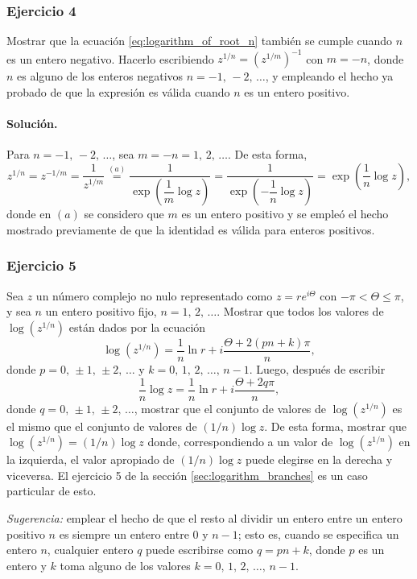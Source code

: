 \documentclass[a4paper]{report}
\begin{document}
\subsubsection{Ejercicio 4}

Mostrar que la ecuación \ref{eq:logarithm_of_root_n} también se cumple cuando \(n\) es un entero negativo. Hacerlo escribiendo \(z^{1/n}=(z^{1/m})^{-1}\) con \(m=-n\), donde \(n\) es alguno de los enteros negativos \(n=-1,\,-2,\,\dots\), y empleando el hecho ya probado de que la expresión es válida cuando \(n\) es un entero positivo. 

\paragraph{Solución.} Para \(n=-1,\,-2,\,\dots\), sea \(m=-n=1,\,2,\,\dots\). De esta forma,
\[
 z^{1/n}=z^{-1/m}=\frac{1}{z^{1/m}}\overset{(a)}{=}\dfrac{1}{\exp\left(\dfrac{1}{m}\log z\right)}=\dfrac{1}{\exp\left(-\dfrac{1}{n}\log z\right)}=\exp\left(\frac{1}{n}\log z\right),
\]
donde en \((a)\) se considero que \(m\) es un entero positivo y se empleó el hecho mostrado previamente de que la identidad es válida para enteros positivos.

\subsubsection{Ejercicio 5}

Sea \(z\) un número complejo no nulo representado como \(z=re^{i\Theta}\) con \(-\pi<\Theta\leq\pi\), y sea \(n\) un entero positivo fijo, \(n=1,\,2,\,\dots\). Mostrar que todos los valores de \(\log(z^{1/n})\) están dados por la ecuación
\[
 \log(z^{1/n})=\frac{1}{n}\ln r+i\frac{\Theta+2(pn+k)\pi}{n},
\]
donde \(p=0,\,\pm1,\,\pm2,\,\dots\) y \(k=0,\,1,\,2,\,\dots,\,n-1\). Luego, después de escribir
\[
 \frac{1}{n}\log z=\frac{1}{n}\ln r+i\frac{\Theta+2q\pi}{n},
\]
donde \(q=0,\,\pm1,\,\pm2,\,\dots\), mostrar que el conjunto de valores de \(\log(z^{1/n})\) es el mismo que el conjunto de valores de \((1/n)\log z\). De esta forma, mostrar que \(\log(z^{1/n})=(1/n)\log z\) donde, correspondiendo a un valor de \(\log(z^{1/n})\) en la izquierda, el valor apropiado de \((1/n)\log z\) puede elegirse en la derecha y viceversa. El ejercicio 5 de la sección \ref{sec:logarithm_branches} es un caso particular de esto. 

\emph{Sugerencia:} emplear el hecho de que el resto al dividir un entero entre un entero positivo \(n\) es siempre un entero entre 0 y \(n-1\); esto es, cuando se especifica un entero \(n\), cualquier entero \(q\) puede escribirse como \(q=pn+k\), donde \(p\) es un entero y \(k\) toma alguno de los valores \(k=0,\,1,\,2,\,\dots,\,n-1\).
\end{document}
